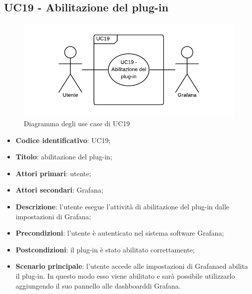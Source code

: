 \subsection{UC19 - Abilitazione del plug-in}
\begin{figure}[H]
	\includegraphics{img/UC19_-_Abilitazione_del_plug-in.png}
	\caption{Diagramma degli use case di UC19}
\end{figure}
\begin{itemize}
	\item \textbf{Codice identificativo}: UC19;
	\item \textbf{Titolo}: abilitazione del plug-in;
	\item \textbf{Attori primari}: utente;
	\item \textbf{Attori secondari}: Grafana\glo;
	\item \textbf{Descrizione}: l'utente esegue l'attività di abilitazione del plug-in dalle impostazioni di Grafana\glo;
	\item \textbf{Precondizioni}: l'utente è autenticato nel sistema software Grafana\glo;
	\item \textbf{Postcondizioni}: il plug-in è stato abilitato correttamente;
	\item \textbf{Scenario principale}: l'utente accede alle impostazioni di Grafana\glosp ed abilita il plug-in. In questo modo esso viene abilitato e sarà possibile utilizzarlo aggiungendo il suo pannello alle dashboard\glosp di Grafana\glo.
\end{itemize}

